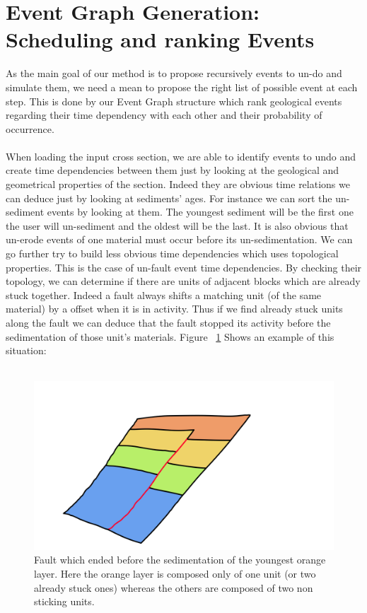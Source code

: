 \documentclass[12pt, a4paper]{report} %
\begin{document}
\section{Event Graph Generation: Scheduling and ranking Events}
\label{sec:eventgraph}
As the main goal of our method is to propose recursively events to un-do and simulate them, we need a mean to propose the right list of possible event at each step. This is done by our Event Graph structure which rank geological events regarding their time dependency with each other and their probability of occurrence.\\\\
When loading the input cross section, we are able to identify events to undo and create time dependencies between them just by looking at the geological and geometrical properties of the section. Indeed they are obvious time relations we can deduce just by looking at sediments' ages. For instance we can sort the un-sediment events by looking at them. The youngest sediment will be the first one the user will un-sediment and the oldest will be the last. It is also obvious that un-erode events of one material must occur before its un-sedimentation. 
We can go further try to build less obvious time dependencies which uses topological properties. This is the case of un-fault event time dependencies. By checking their topology, we can determine if there are units of adjacent blocks which are already stuck together. Indeed a fault always shifts a matching unit (of the same material) by a offset when it is in activity. Thus if we find already stuck units along the fault we can deduce that the fault stopped its activity before the sedimentation of those unit's materials. Figure ~\ref{faultstick} Shows an example of this situation:\\\\
	\begin{figure}[H]
	\centering
	\includegraphics[scale=0.5]{unFaultSedDescription.png}
	\caption{Fault which ended before the sedimentation of the youngest orange layer. Here the orange layer is composed only of one unit (or two already stuck ones) whereas the others are composed of two non sticking units.}
	\label{faultstick}
	\end{figure}
	
\end{document}
